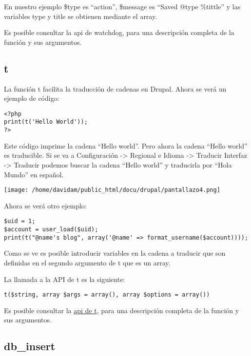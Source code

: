 \documentclass[11pt]{article}
\begin{document}
En nuestro ejemplo \$type es ``action'', \$message es ``Saved @type
\%tittle'' y las variables type y title se obtienen mediante el array.

Es posible consultar la api de watchdog, para una descripción completa
de la función y sus argumentos.

\subsection{t}
\label{sec-1.13}


La función t facilita la traducción de cadenas en Drupal. Ahora se
verá un ejemplo de código:


\begin{verbatim}
<?php
print(t('Hello World'));
?>
\end{verbatim}



Este código imprime la cadena ``Hello world''. Pero ahora la cadena
``Hello world'' es traducible. Si se va a Configuración -> Regional e
Idioma -> Traducir Interfaz -> Traducir podemos buscar la cadena
``Hello world'' y traducirla por ``Hola Mundo'' en español.

\texttt{[image: /home/davidam/public\_html/docu/drupal/pantallazo4.png]}

Ahora se verá otro ejemplo:


\begin{verbatim}
$uid = 1;
$account = user_load($uid);
print(t("@name's blog", array('@name' => format_username($account))));
\end{verbatim}



Como se ve es posible introducir variables en la cadena a traducir que
son definidas en el segundo argumento de t que es un array.  

La llamada a la API de t es la siguiente:


\begin{verbatim}
t($string, array $args = array(), array $options = array())
\end{verbatim}



Es posible consultar la \href{http://api.drupal.org/api/drupal/includes--bootstrap.inc/function/t/7}{api de t}, para una descripción completa de la
función y sus argumentos.

\subsection{db\_insert}
\label{sec-1.14}
\end{document}
